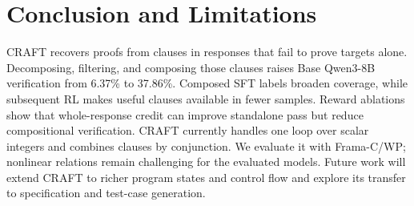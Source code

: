 \section{Conclusion and Limitations}\label{sec:conclusion}
\enlargethispage{2\baselineskip}

CRAFT recovers proofs from clauses in responses that fail to prove targets
alone. Decomposing, filtering, and composing those clauses raises Base
Qwen3-8B verification from 6.37\% to 37.86\%.
Composed SFT labels broaden coverage, while subsequent RL makes useful
clauses available in fewer samples. Reward ablations show that whole-response
credit can improve standalone pass but reduce compositional verification.
CRAFT currently handles one loop
over scalar integers and combines clauses by conjunction. We evaluate it with
Frama-C/WP; nonlinear relations remain challenging for the evaluated models.
Future work will extend CRAFT to richer program states and control flow
and explore its transfer to specification and test-case generation.
